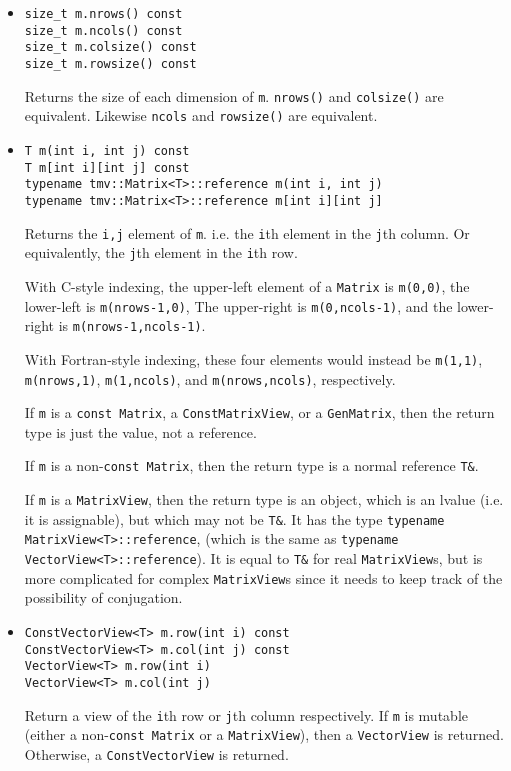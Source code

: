 \documentclass[twoside,letterpaper,11pt]{article}
\renewcommand{\tt}[1]{{\texttt {#1}}}
\begin{document}
\begin{itemize}
\item
\begin{verbatim}
size_t m.nrows() const
size_t m.ncols() const
size_t m.colsize() const
size_t m.rowsize() const
\end{verbatim}
Returns the size of each dimension of \tt{m}.  \tt{nrows()} and \tt{colsize()} are equivalent.
Likewise \tt{ncols} and \tt{rowsize()} are equivalent.

\item
\begin{verbatim}
T m(int i, int j) const
T m[int i][int j] const
typename tmv::Matrix<T>::reference m(int i, int j)
typename tmv::Matrix<T>::reference m[int i][int j]
\end{verbatim}
Returns the \tt{i,j} element of \tt{m}. i.e. the \tt{i}th element in the 
\tt{j}th column.  Or
equivalently, the \tt{j}th element in the \tt{i}th row. 

With C-style indexing, the upper-left element
of a \tt{Matrix} is \tt{m(0,0)}, the lower-left is \tt{m(nrows-1,0)},
The upper-right is \tt{m(0,ncols-1)}, and the lower-right is
\tt{m(nrows-1,ncols-1)}.

With Fortran-style indexing, these four elements would instead be
\tt{m(1,1)}, \tt{m(nrows,1)}, \tt{m(1,ncols)}, and \tt{m(nrows,ncols)},
respectively.

If \tt{m} is a 
\tt{const Matrix}, a \tt{ConstMatrixView}, or a \tt{GenMatrix}, 
then the return type is just the value, not a reference.

If \tt{m} is a 
non-\tt{const Matrix}, then the return type is a normal reference \tt{T\&}.

If \tt{m} is a \tt{MatrixView}, then the return type is an object,
which is an lvalue (i.e. it is assignable), but which may not be \tt{T\&}.
It has the type \tt{typename MatrixView<T>::reference}, 
(which is the same as \tt{typename VectorView<T>::reference}).
It is equal to \tt{T\&} for real \tt{MatrixView}s, but is
more complicated for complex \tt{MatrixView}s since it needs to 
keep track of the possibility of conjugation.

\item
\begin{verbatim}
ConstVectorView<T> m.row(int i) const
ConstVectorView<T> m.col(int j) const
VectorView<T> m.row(int i)
VectorView<T> m.col(int j)
\end{verbatim}
Return a view of the \tt{i}th row or \tt{j}th column respectively.
If \tt{m} is mutable (either a non-\tt{const Matrix} or a \tt{MatrixView}),
then a \tt{VectorView} is returned.  Otherwise, a \tt{ConstVectorView}
is returned.


\end{itemize}
\end{document}
